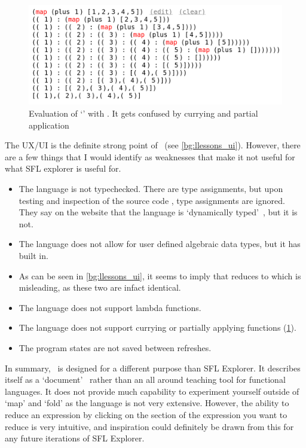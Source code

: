 \begin{figure}[t]
    \centering
    \includegraphics[width=0.75\linewidth]{images/LLessonsGoingWrong.png}
    \caption{Evaluation of `' with \llessons. It gets confused by currying and partial application}
    \label{bg:llessons_gets_confused}
\end{figure}

\noindent The UX/UI is the definite strong point of \llessons\ (see \ref{bg:llessons_ui}).  However, there are a few things that I would identify as weaknesses that make it not useful for what SFL explorer is useful for.

\begin{itemize}
    \item The language is not typechecked. There are type assignments, but upon testing and inspection of the source code \cite{lambdalessonsgithub}, type assignments are ignored. They say on the website that the language is `dynamically typed'~\cite{lambdalessons}, but it is not. 
    \item The language does not allow for user defined algebraic data types, but it has  built in. 
    \item As can be seen in \ref{bg:llessons_ui}, it seems to imply that  reduces to \sflinline{[x, y]} which is misleading, as these two are infact identical. 
    \item The language does not support lambda functions.
    \item The language does not support currying or partially applying functions (\ref{bg:llessons_gets_confused}).
    \item The program states are not saved between refreshes. 
\end{itemize} 

\noindent In summary, \llessons\ is designed for a different purpose than SFL Explorer. It describes itself as a `document'~\cite{lambdalessons} rather than an all around teaching tool for functional languages. It does not provide much capability to experiment yourself outside of `map' and `fold' as the language is not very extensive. However, the ability to reduce an expression by clicking on the section of the expression you want to reduce is very intuitive, and inspiration could definitely be drawn from this for any future iterations of SFL Explorer. 

